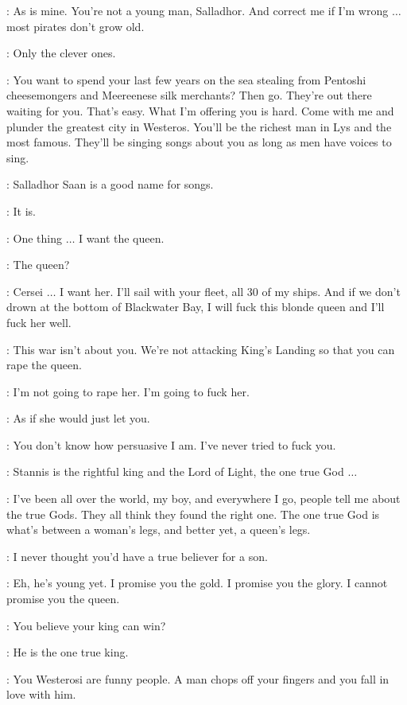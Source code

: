\DAVOS: As is mine. You're not a young man, Salladhor. And correct me if I'm wrong $\ldots$ most pirates don't grow old.

\SALLADHOR: Only the clever ones.

\DAVOS: You want to spend your last few years on the sea stealing from Pentoshi cheesemongers and Meereenese silk merchants? Then go. They're out there waiting for you. That's easy. What I'm offering you is hard. Come with me and plunder the greatest city in Westeros. You'll be the richest man in Lys and the most famous. They'll be singing songs about you as long as men have voices to sing.

\SALLADHOR: Salladhor Saan is a good name for songs.

\DAVOS: It is.

\SALLADHOR: One thing $\ldots$ I want the queen.

\DAVOS: The queen?

\SALLADHOR: Cersei $\ldots$ I want her. I'll sail with your fleet, all 30 of my ships. And if we don't drown at the bottom of Blackwater Bay, I will fuck this blonde queen and I'll fuck her well.

\MATTHOS: This war isn't about you. We're not attacking King's Landing so that you can rape the queen.

\SALLADHOR: I'm not going to rape her. I'm going to fuck her.

\MATTHOS: As if she would just let you.

\SALLADHOR: You don't know how persuasive I am. I've never tried to fuck you.

\MATTHOS: Stannis is the rightful king and the Lord of Light, the one true God $\ldots$

\SALLADHOR: I've been all over the world, my boy, and everywhere I go, people tell me about the true Gods. They all think they found the right one. The one true God is what's between a woman's legs, and better yet, a queen's legs.


\SALLADHOR: I never thought you'd have a true believer for a son.

\DAVOS: Eh, he's young yet. I promise you the gold. I promise you the glory. I cannot promise you the queen.

\SALLADHOR: You believe your king can win?

\DAVOS: He is the one true king.

\SALLADHOR: You Westerosi are funny people. A man chops off your fingers and you fall in love with him.

